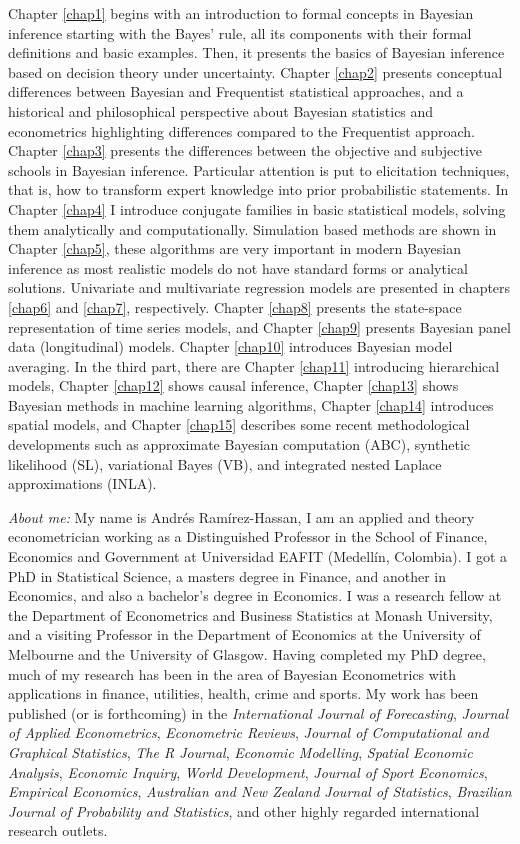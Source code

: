 Chapter \ref{chap1} begins with an introduction to formal concepts in Bayesian inference starting with the Bayes’ rule, all its components with their formal definitions and basic examples. Then, it presents the basics of Bayesian inference based on decision theory under uncertainty. Chapter \ref{chap2} presents conceptual differences between Bayesian and Frequentist statistical approaches, and a historical and philosophical perspective about Bayesian statistics and econometrics highlighting differences compared to the Frequentist approach. Chapter \ref{chap3} presents the differences between the objective and subjective schools in Bayesian inference. Particular attention is put to elicitation techniques, that is, how to transform expert knowledge into prior probabilistic statements. In Chapter \ref{chap4} I introduce conjugate families in basic statistical models, solving them analytically and computationally. Simulation based methods are shown in Chapter \ref{chap5}, these algorithms are very important in modern Bayesian inference as most realistic models do not have standard forms or analytical solutions. Univariate and multivariate regression models are presented in chapters \ref{chap6} and \ref{chap7}, respectively. Chapter \ref{chap8} presents the state-space representation of time series models, and Chapter \ref{chap9} presents Bayesian panel data (longitudinal) models. Chapter \ref{chap10} introduces Bayesian model averaging. In the third part, there are Chapter \ref{chap11} introducing hierarchical models, Chapter \ref{chap12} shows causal inference, Chapter \ref{chap13} shows Bayesian methods in machine learning algorithms, Chapter \ref{chap14} introduces spatial models, and Chapter \ref{chap15} describes some recent methodological developments such as approximate Bayesian computation (ABC), synthetic likelihood (SL), variational Bayes (VB), and integrated nested Laplace approximations (INLA).

\textit{About me:} My name is Andrés Ramírez-Hassan, I am an applied and theory econometrician working as a Distinguished Professor in the School of Finance, Economics and Government at Universidad EAFIT (Medellín, Colombia). I got a PhD in Statistical Science, a masters degree in Finance, and another in Economics, and also a bachelor’s degree in Economics. I was a research fellow at the Department of Econometrics and Business Statistics at Monash University, and a visiting Professor in the Department of Economics at the University of Melbourne and the University of Glasgow. Having completed my PhD degree, much of my research has been in the area of Bayesian Econometrics with applications in finance, utilities, health, crime and sports. My work has been published  (or is forthcoming) in the \textit{International Journal of Forecasting}, \textit{Journal of Applied Econometrics}, \textit{Econometric Reviews}, \textit{Journal of Computational and Graphical Statistics}, \textit{The R Journal}, \textit{Economic Modelling}, \textit{Spatial Economic Analysis}, \textit{Economic Inquiry}, \textit{World Development}, \textit{Journal of Sport Economics}, \textit{Empirical Economics}, \textit{Australian and New Zealand Journal of Statistics}, \textit{Brazilian Journal of Probability and Statistics}, and other highly regarded international research outlets.

